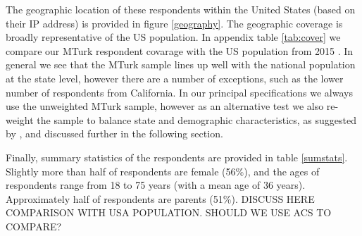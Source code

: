 \documentclass[a4paper, 11pt]{article}
\begin{document}
\begin{spacing}{1.4}
The geographic location of these respondents within the United States (based
on their IP address) is provided in figure \ref{geography}.  The geographic
coverage is broadly representative of the US population.  In appendix table
\ref{tab:cover} we compare our MTurk respondent covarage with the US population
from 2015 \citep{CensusBureau2015}.  In general we see that the MTurk sample
lines up well with the national population at the state level, however there
are a number of exceptions, such as the lower number of respondents from
California.  In our principal specifications we always use the unweighted
MTurk sample, however as an alternative test we also re-weight the sample
to balance state and demographic characteristics, as suggested by
\citet{Francis-TanMialon2015}, and discussed further in the following section.

Finally, summary statistics of the respondents are provided in table
\ref{sumstats}.  Slightly more than half of respondents are female (56\%),
and the ages of respondents range from 18 to 75 years (with a mean age of 36
years).  Approximately half of respondents are parents (51\%).  DISCUSS
HERE COMPARISON WITH USA POPULATION.  SHOULD WE USE ACS TO COMPARE?



\end{spacing}
\end{document}
